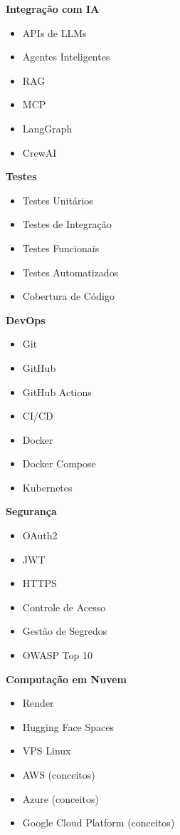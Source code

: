 \textbf{Integração com IA}

\begin{itemize}
\item APIs de LLMs
\item Agentes Inteligentes
\item RAG
\item MCP
\item LangGraph
\item CrewAI
\end{itemize}

\textbf{Testes}

\begin{itemize}
\item Testes Unitários
\item Testes de Integração
\item Testes Funcionais
\item Testes Automatizados
\item Cobertura de Código
\end{itemize}

\textbf{DevOps}

\begin{itemize}
\item Git
\item GitHub
\item GitHub Actions
\item CI/CD
\item Docker
\item Docker Compose
\item Kubernetes
\end{itemize}

\textbf{Segurança}

\begin{itemize}
\item OAuth2
\item JWT
\item HTTPS
\item Controle de Acesso
\item Gestão de Segredos
\item OWASP Top 10
\end{itemize}

\textbf{Computação em Nuvem}

\begin{itemize}
\item Render
\item Hugging Face Spaces
\item VPS Linux
\item AWS (conceitos)
\item Azure (conceitos)
\item Google Cloud Platform (conceitos)
\end{itemize}

